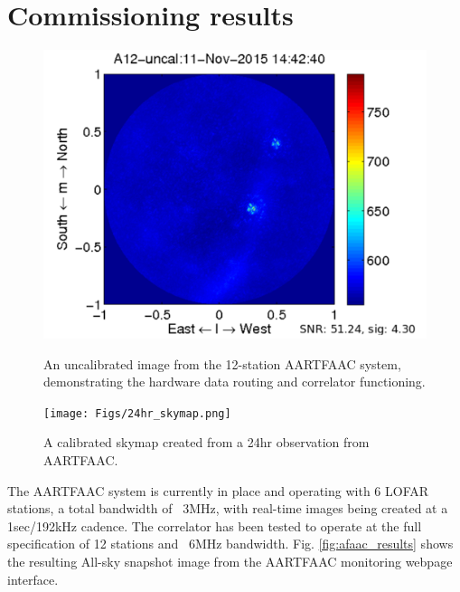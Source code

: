 \documentclass{ws-jai}
\begin{document}
\section {\label{sec:results} Commissioning results}
\begin{figure}[htbp]
 \begin {minipage}{\textwidth}
   \includegraphics[width=\textwidth]{Figs/A12_uncal.png}
\caption{An uncalibrated image from the 12-station AARTFAAC system, demonstrating the hardware data routing and  correlator functioning.}
\label{fig:afaac_results}
 \end {minipage}
 
\begin {minipage}{\textwidth}
   \texttt{[image: Figs/24hr\_skymap.png]}
\caption{A calibrated skymap created from a 24hr observation from AARTFAAC.}
\label{fig:afaac_24hr}
 \end {minipage}
  
\end{figure}
The AARTFAAC system is currently in place and operating with 6 LOFAR stations, a
total bandwidth of  ~3MHz, with real-time images being created  at a 1sec/192kHz
cadence. The correlator has been tested  to operate at the full specification of
12  stations  and  ~6MHz  bandwidth.  Fig.   \ref{fig:afaac_results}  shows  the
resulting All-sky snapshot image from the AARTFAAC monitoring webpage interface.

\end{document}

